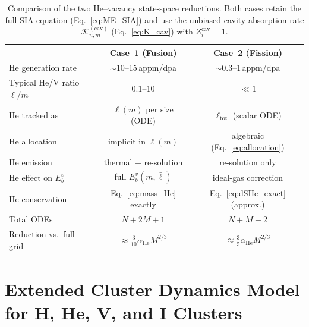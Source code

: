 \documentclass[pdflatex,sn-basic]{sn-jnl} %
\begin{document}
\begin{table}[htbp]
\centering
\caption{Comparison of the two He--vacancy state-space reductions.
Both cases retain the full SIA equation (Eq.~\ref{eq:ME_SIA}) and use
the unbiased cavity absorption rate $\mathcal{K}_{n,m}^{(\mathrm{cav})}$
(Eq.~\ref{eq:K_cav}) with $Z_i^{\mathrm{cav}}=1$.}
\label{tab:HeV_comparison}
\renewcommand{\arraystretch}{1.2}
\begin{tabular}{@{}lcc@{}}
\toprule
& \textbf{Case~1 (Fusion)} & \textbf{Case~2 (Fission)} \\
\midrule
He generation rate & $\sim$10--15\,appm/dpa & $\sim$0.3--1\,appm/dpa \\
Typical He/V ratio $\bar{\ell}/m$ & 0.1--10 & $\ll 1$ \\
He tracked as & $\bar{\ell}(m)$ per size (ODE) & $\ell_{\mathrm{tot}}$ (scalar ODE) \\
He allocation & implicit in $\bar{\ell}(m)$ & algebraic (Eq.~\ref{eq:allocation}) \\
He emission & thermal + re-solution & re-solution only \\
He effect on $E_b^v$ & full $E_b^v(m,\bar{\ell})$ & ideal-gas correction \\
He conservation & Eq.~\ref{eq:mass_He} exactly & Eq.~\ref{eq:dSHe_exact} (approx.) \\
Total ODEs & $N + 2M + 1$ & $N + M + 2$ \\
Reduction vs.\ full grid & $\approx \tfrac{3}{10}\alpha_{\mathrm{He}} M^{2/3}$ & $\approx \tfrac{3}{5}\alpha_{\mathrm{He}} M^{2/3}$ \\
\bottomrule
\end{tabular}
\end{table}
\section{Extended Cluster Dynamics Model for H, He, V, and I Clusters}
\label{sec:H_extended}
\end{document}
